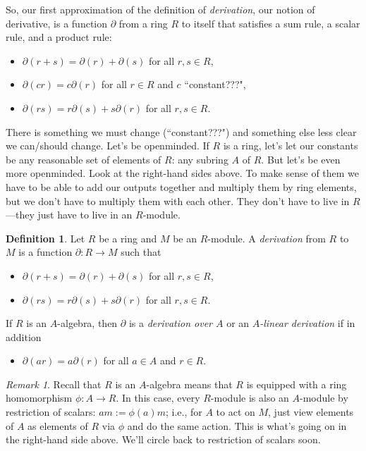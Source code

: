 \documentclass{amsart}[12pt]
\numberwithin{equation}{section}
\theoremstyle{plain} %
\theoremstyle{definition}
\newtheorem{defn}[equation]{Definition}
\theoremstyle{remark}
\newtheorem{rem}[equation]{Remark}
\begin{document}
So, our first approximation of the definition of \emph{derivation}, our notion of derivative, is a function $\partial$ from a ring $R$ to itself that satisfies a sum rule, a scalar rule, and a product rule:
\begin{itemize}
\item $\partial(r+s) = \partial(r)+\partial(s)$ for all $r,s\in R$,
\item $\partial(cr)= c\partial(r)$ for all $r\in R$ and $c$ ``constant???",
\item $\partial(rs) = r\partial(s) + s\partial(r)$ for all $r,s\in R$.
\end{itemize}

There is something we must change (``constant???") and something else less clear we can/should change. Let's be openminded. If $R$ is a ring, let's let our constants be any reasonable set of elements of $R$: any subring $A$ of $R$. But let's be even more openminded. Look at the right-hand sides above. To make sense of them we have to be able to add our outputs together and multiply them by ring elements, but we don't have to multiply them with each other. They don't have to live in $R$---they just have to live in an $R$-module.

\begin{defn} Let $R$ be a ring and $M$ be an $R$-module. A \emph{derivation} from $R$ to $M$ is a function $\partial:R\to M$ such that
\begin{itemize}
\item $\partial(r+s) = \partial(r) + \partial(s)$ for all $r,s\in R$,
\item $\partial(rs) = r\partial(s) + s\partial(r)$ for all $r,s\in R$.
\end{itemize}
If $R$ is an $A$-algebra, then $\partial$ is a \emph{derivation over $A$} or an \emph{$A$-linear derivation} if in addition
\begin{itemize}
\item $\partial(ar) = a \partial(r)$ for all $a\in A$ and $r\in R$.
\end{itemize}
\end{defn}

\begin{rem} Recall that $R$ is an $A$-algebra means that $R$ is equipped with a ring homomorphism $\phi:A\to R$. In this case, every $R$-module is also an $A$-module by restriction of scalars: $a  m := \phi(a) m$; i.e., for $A$ to act on $M$, just view elements of $A$ as elements of $R$ via $\phi$ and do the same action. This is what's going on in the right-hand side above. We'll circle back to restriction of scalars soon.
\end{rem}
\end{document}
